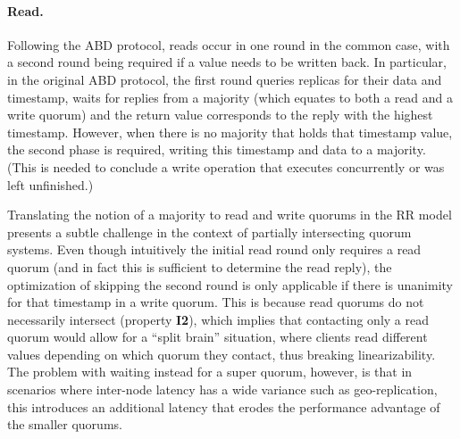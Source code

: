 \paragraph{Read.} Following the ABD protocol, reads occur in one
round in the common case, with a second round being required if a
value needs to be written back. In particular, in the original ABD
protocol, the first round queries replicas for their data and
timestamp, waits for replies from a majority (which equates to both a
read and a write quorum) and the return value corresponds to the reply
with the highest timestamp. However, when there is no majority that
holds that timestamp value, the second phase is required, writing this
timestamp and data to a majority. (This is needed to conclude a write
operation that executes concurrently or was left unfinished.)

Translating the notion of a majority to read and write quorums in the
\ac{RR} model presents a subtle challenge in the context of
partially intersecting quorum systems. Even though
intuitively the initial read round only requires a read quorum (and in
fact this is sufficient to determine the read reply), the optimization
of skipping the second round is only applicable if there is unanimity
for that timestamp in a write quorum. This is because read quorums do
not necessarily intersect (property \textbf{I2}), which implies that
contacting only a read quorum would allow for a ``split brain''
situation, where clients read different values depending on which
quorum they contact, thus breaking linearizability. The problem with
waiting instead for a super quorum, however, is that in scenarios
where inter-node latency has a wide variance such as geo-replication,
this introduces an additional latency that erodes the performance
advantage of the smaller quorums.






